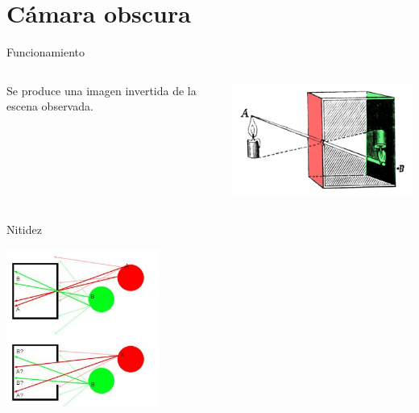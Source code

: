\documentclass{if-beamer}
\begin{document}
\section{Cámara obscura}
\begin{frame}{Funcionamiento}
\begin{columns}
\begin{column}{0.5\textwidth}
     Se produce una imagen invertida de la escena observada.
\end{column}
\begin{column}{0.5\textwidth}  %
    \begin{center}
     \includegraphics[width=\textwidth]{cameraobscura.png}
     \end{center}
\end{column}
\end{columns}
\end{frame}

\begin{frame}{Nitidez}

\begin{center}
 \includegraphics[width=5cm]{diametro.JPG}
\end{center}

\end{frame}
\end{document}
